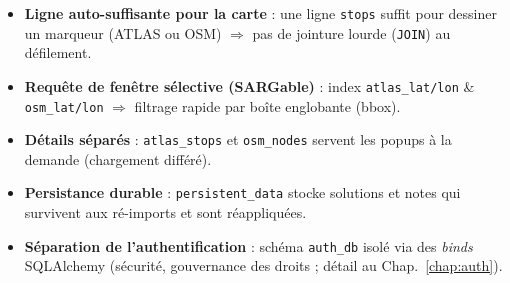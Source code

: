 \begin{itemize}
  \item \textbf{Ligne auto-suffisante pour la carte} : une ligne \texttt{stops} suffit pour dessiner un marqueur (ATLAS ou OSM) $\Rightarrow$ pas de jointure lourde (\texttt{JOIN}) au défilement.
  \item \textbf{Requête de fenêtre sélective (SARGable)} : index \texttt{atlas\_lat/lon} \& \texttt{osm\_lat/lon} $\Rightarrow$ filtrage rapide par boîte englobante (bbox).
  \item \textbf{Détails séparés} : \texttt{atlas\_stops} et \texttt{osm\_nodes} servent les popups à la demande (chargement différé).
  \item \textbf{Persistance durable} : \texttt{persistent\_data} stocke solutions et notes qui \og survivent \fg{} aux ré-imports et sont réappliquées.
  \item \textbf{Séparation de l’authentification} : schéma \texttt{auth\_db} isolé via des \textit{binds} SQLAlchemy (sécurité, gouvernance des droits ; détail au Chap.~\ref{chap:auth}).
\end{itemize}